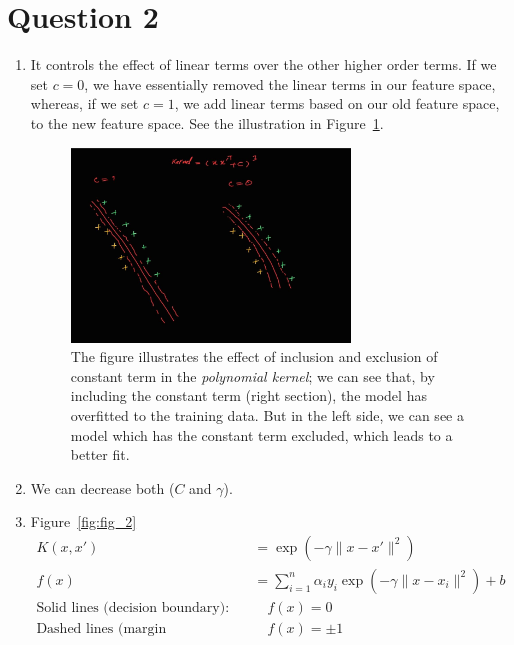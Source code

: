 \documentclass[a4paper,12pt]{article}
\begin{document}
\section*{Question 2}
\begin{enumerate}[label=(\alph*)]
    \item It controls the effect of linear terms over the other higher order terms. If we set $c = 0$, we have essentially removed the linear terms in our feature space, 
    whereas, if we set $c = 1$, we add linear terms based on our old feature space, to the new feature space. See the illustration in Figure~\ref{fig:fig_1}.
    \begin{figure}[H]
        \centering
        \includegraphics[width=0.7\textwidth]{../images/q2b.jpg}
        \caption{The figure illustrates the effect of inclusion and exclusion of constant term in the \textit{polynomial kernel}; 
        we can see that, by including the constant term (right section), the model has overfitted to the training data. 
        But in the left side, we can see a model which has the constant term excluded, which leads to a better fit.}
        \label{fig:fig_1}
    \end{figure}
    \item We can decrease both ($C$ and $\gamma$).
    \item Figure~\ref{fig:fig_2}
    \begin{align*}
    K(x, x') &= \exp\left(-\gamma \|x - x'\|^2\right) \\
    f(x) &= \sum_{i=1}^{n} \alpha_i y_i \exp\left(-\gamma \|x - x_i\|^2\right) + b \\
    \text{Solid lines (decision boundary):} &\quad f(x) = 0 \\
    \text{Dashed lines (margin boundaries):} &\quad f(x) = \pm 1
    \end{align*}
    \begin{figure}[H]
        \centering

\end{figure}
\end{enumerate}
\end{document}
